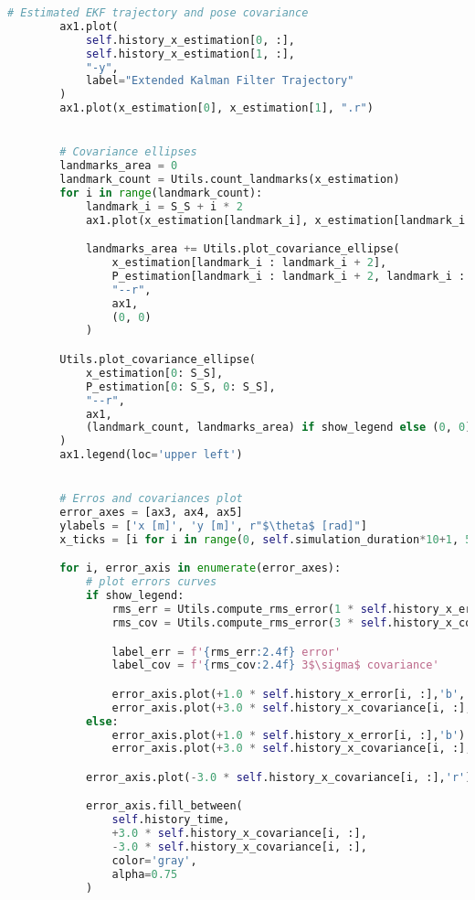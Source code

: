 \documentclass[../CSC_5RO12_TA_TP4.tex]{subfiles}
\begin{document}
\begin{scriptsize}
\begin{lstlisting}[language=Python]
        # Estimated EKF trajectory and pose covariance
        ax1.plot(
            self.history_x_estimation[0, :],
            self.history_x_estimation[1, :],
            "-y",
            label="Extended Kalman Filter Trajectory"
        )
        ax1.plot(x_estimation[0], x_estimation[1], ".r")


        # Covariance ellipses
        landmarks_area = 0
        landmark_count = Utils.count_landmarks(x_estimation)
        for i in range(landmark_count):
            landmark_i = S_S + i * 2
            ax1.plot(x_estimation[landmark_i], x_estimation[landmark_i + 1], "xr")

            landmarks_area += Utils.plot_covariance_ellipse(
                x_estimation[landmark_i : landmark_i + 2],
                P_estimation[landmark_i : landmark_i + 2, landmark_i : landmark_i + 2],
                "--r",
                ax1,
                (0, 0)
            )

        Utils.plot_covariance_ellipse(
            x_estimation[0: S_S],
            P_estimation[0: S_S, 0: S_S],
            "--r",
            ax1,
            (landmark_count, landmarks_area) if show_legend else (0, 0)
        )
        ax1.legend(loc='upper left')


        # Erros and covariances plot
        error_axes = [ax3, ax4, ax5]
        ylabels = ['x [m]', 'y [m]', r"$\theta$ [rad]"]
        x_ticks = [i for i in range(0, self.simulation_duration*10+1, 50)]

        for i, error_axis in enumerate(error_axes):
            # plot errors curves
            if show_legend:
                rms_err = Utils.compute_rms_error(1 * self.history_x_error[i, :])
                rms_cov = Utils.compute_rms_error(3 * self.history_x_covariance[i, :])

                label_err = f'{rms_err:2.4f} error'
                label_cov = f'{rms_cov:2.4f} 3$\sigma$ covariance'

                error_axis.plot(+1.0 * self.history_x_error[i, :],'b', label=label_err)
                error_axis.plot(+3.0 * self.history_x_covariance[i, :],'r', label=label_cov)
            else:
                error_axis.plot(+1.0 * self.history_x_error[i, :],'b')
                error_axis.plot(+3.0 * self.history_x_covariance[i, :],'r')

            error_axis.plot(-3.0 * self.history_x_covariance[i, :],'r')

            error_axis.fill_between(
                self.history_time,
                +3.0 * self.history_x_covariance[i, :],
                -3.0 * self.history_x_covariance[i, :],
                color='gray',
                alpha=0.75
            )


\end{lstlisting}
\end{scriptsize}
\end{document}
